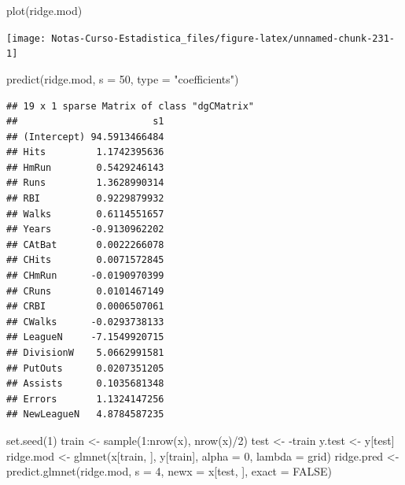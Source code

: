 \documentclass[
  12pt,
]{book}
\newenvironment{Shaded}{\begin{snugshade}}{\end{snugshade}}
\newcommand{\AttributeTok}[1]{\textcolor[rgb]{0.77,0.63,0.00}{#1}}
\newcommand{\ConstantTok}[1]{\textcolor[rgb]{0.00,0.00,0.00}{#1}}
\newcommand{\DecValTok}[1]{\textcolor[rgb]{0.00,0.00,0.81}{#1}}
\newcommand{\FunctionTok}[1]{\textcolor[rgb]{0.00,0.00,0.00}{#1}}
\newcommand{\NormalTok}[1]{#1}
\newcommand{\OtherTok}[1]{\textcolor[rgb]{0.56,0.35,0.01}{#1}}
\newcommand{\SpecialCharTok}[1]{\textcolor[rgb]{0.00,0.00,0.00}{#1}}
\newcommand{\StringTok}[1]{\textcolor[rgb]{0.31,0.60,0.02}{#1}}
\theoremstyle{definition}
\theoremstyle{definition}
\theoremstyle{definition}
\theoremstyle{definition}
\theoremstyle{remark}
\begin{document}
\begin{Shaded}
\begin{Highlighting}[]
\FunctionTok{plot}\NormalTok{(ridge.mod)}
\end{Highlighting}
\end{Shaded}

\begin{center}\texttt{[image: Notas-Curso-Estadistica\_files/figure-latex/unnamed-chunk-231-1]} \end{center}

\begin{Shaded}
\begin{Highlighting}[]
\FunctionTok{predict}\NormalTok{(ridge.mod, }\AttributeTok{s =} \DecValTok{50}\NormalTok{, }\AttributeTok{type =} \StringTok{"coefficients"}\NormalTok{)}
\end{Highlighting}
\end{Shaded}

\begin{verbatim}
## 19 x 1 sparse Matrix of class "dgCMatrix"
##                        s1
## (Intercept) 94.5913466484
## Hits         1.1742395636
## HmRun        0.5429246143
## Runs         1.3628990314
## RBI          0.9229879932
## Walks        0.6114551657
## Years       -0.9130962202
## CAtBat       0.0022266078
## CHits        0.0071572845
## CHmRun      -0.0190970399
## CRuns        0.0101467149
## CRBI         0.0006507061
## CWalks      -0.0293738133
## LeagueN     -7.1549920715
## DivisionW    5.0662991581
## PutOuts      0.0207351205
## Assists      0.1035681348
## Errors       1.1324147256
## NewLeagueN   4.8784587235
\end{verbatim}

\begin{Shaded}
\begin{Highlighting}[]
\FunctionTok{set.seed}\NormalTok{(}\DecValTok{1}\NormalTok{)}
\NormalTok{train }\OtherTok{\textless{}{-}} \FunctionTok{sample}\NormalTok{(}\DecValTok{1}\SpecialCharTok{:}\FunctionTok{nrow}\NormalTok{(x), }\FunctionTok{nrow}\NormalTok{(x)}\SpecialCharTok{/}\DecValTok{2}\NormalTok{)}
\NormalTok{test }\OtherTok{\textless{}{-}} \SpecialCharTok{{-}}\NormalTok{train}
\NormalTok{y.test }\OtherTok{\textless{}{-}}\NormalTok{ y[test]}
\NormalTok{ridge.mod }\OtherTok{\textless{}{-}} \FunctionTok{glmnet}\NormalTok{(x[train, ], y[train], }\AttributeTok{alpha =} \DecValTok{0}\NormalTok{,}
    \AttributeTok{lambda =}\NormalTok{ grid)}
\NormalTok{ridge.pred }\OtherTok{\textless{}{-}} \FunctionTok{predict.glmnet}\NormalTok{(ridge.mod, }\AttributeTok{s =} \DecValTok{4}\NormalTok{, }\AttributeTok{newx =}\NormalTok{ x[test,}
\NormalTok{    ], }\AttributeTok{exact =} \ConstantTok{FALSE}\NormalTok{)}
\end{Highlighting}
\end{Shaded}
\end{document}
